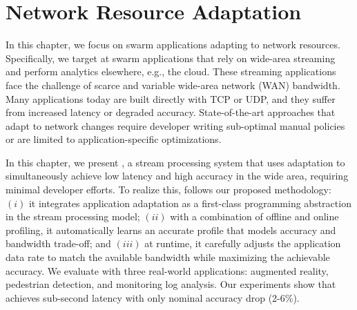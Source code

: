 \documentclass[thesis.tex]{subfiles}
\begin{document}
\chapter{Network Resource Adaptation}
\label{cha:netw-reso-adapt}

In this chapter, we focus on swarm applications adapting to network
resources. Specifically, we target at swarm applications that rely on wide-area
streaming and perform analytics elsewhere, e.g., the cloud. These streaming
applications face the challenge of scarce and variable wide-area network (WAN)
bandwidth. Many applications today are built directly with TCP or UDP, and they
suffer from increased latency or degraded accuracy. State-of-the-art approaches
that adapt to network changes require developer writing sub-optimal manual
policies or are limited to application-specific optimizations.

In this chapter, we present \awstream{}, a stream processing system that uses
adaptation to simultaneously achieve low latency and high accuracy in the wide
area, requiring minimal developer efforts. To realize this, \awstream{} follows
our proposed methodology: $(i)$ it integrates application adaptation as a
first-class programming abstraction in the stream processing model; $(ii)$ with
a combination of offline and online profiling, it automatically learns an
accurate profile that models accuracy and bandwidth trade-off; and $(iii)$ at
runtime, it carefully adjusts the application data rate to match the available
bandwidth while maximizing the achievable accuracy. We evaluate \awstream{} with
three real-world applications: augmented reality, pedestrian detection, and
monitoring log analysis. Our experiments show that \awstream{} achieves
sub-second latency with only nominal accuracy drop (2-6\%).










\end{document}

